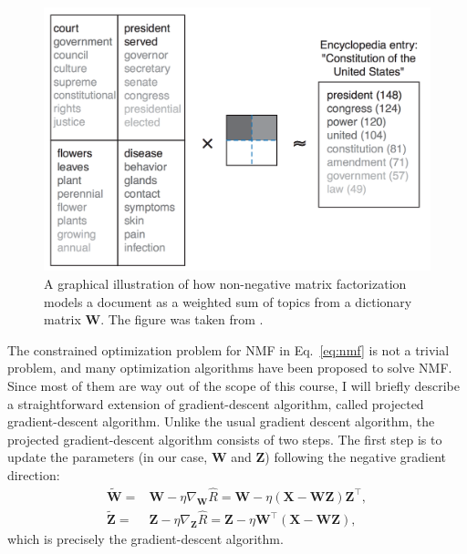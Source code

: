 \documentclass{report}
\newcommand{\matr}[1]{\mathbf{#1}}
\newcommand{\mW}[0]{\matr{W}}
\newcommand{\mZ}[0]{\matr{Z}}
\newcommand{\mX}[0]{\matr{X}}
\begin{document}
\begin{figure}[t]
    \centering
    \begin{minipage}{0.59\columnwidth}
        \centering
        \includegraphics[width=\columnwidth]{figures/nmf_doc.png}
    \end{minipage}
    \begin{minipage}{0.4\columnwidth}
        \caption{
            \label{fig:nmf_doc}
            A graphical illustration of how non-negative matrix factorization
            models a document as a weighted sum of topics from a dictionary
            matrix $\mW$. The figure was taken from \cite{lee2001algorithms}.
        }
    \end{minipage}
\end{figure}

The constrained optimization problem for NMF in Eq.~\eqref{eq:nmf} is not a
trivial problem, and many optimization algorithms have been proposed to solve
NMF. Since most of them are way out of the scope of this course, I will briefly
describe a straightforward extension of gradient-descent algorithm, called
projected gradient-descent algorithm. Unlike the usual gradient descent
algorithm, the projected gradient-descent algorithm consists of two steps. The
first step is to update the parameters (in our case, $\mW$ and $\mZ$) following
the negative gradient direction:
\begin{align}
    \label{eq:nmf_dw}
    \tilde{\mW} =& \mW - \eta \nabla_{\mW} \hat{R} = \mW - \eta (\mX - \mW \mZ)
    \mZ^\top, \\
    \label{eq:nmf_dz}
    \tilde{\mZ} =& \mZ - \eta \nabla_{\mZ} \hat{R} = \mZ - \eta \mW^\top (\mX -
    \mW \mZ), 
\end{align}
which is precisely the gradient-descent algorithm. 
\end{document}
